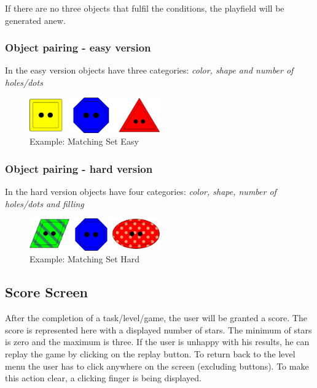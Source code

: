 If there are no three objects that fulfil the conditions, the playfield will be generated anew.

\subsubsection{Object pairing - easy version}\label{subsubsec:object-pairing---easy-version}
In the easy version objects have three categories: \textit{color, shape and number of holes/dots}

\begin{figure}[H]
    \centering
    \includegraphics[width=0.5\textwidth]{figures/matchingseteasy}
    \caption{Example: Matching Set Easy}
    \label{fig:matchingseteasy}
\end{figure}

\subsubsection{Object pairing - hard version}\label{subsubsec:object-pairing---hard-version}
In the hard version objects have four categories: \textit{color, shape, number of holes/dots and filling}

\begin{figure}[H]
    \centering
    \includegraphics[width=0.5\textwidth]{figures/matchingsethard}
    \caption{Example: Matching Set Hard}
    \label{fig:matchingsethard}
\end{figure}

\subsection{Score Screen}\label{subsec:score-screen}
After the completion of a task/level/game, the user will be granted a score.
The score is represented here with a displayed number of stars.
The minimum of stars is zero and the maximum is three.
If the user is unhappy with his results, he can replay the game by clicking on the replay button.
To return back to the level menu the user has to click anywhere on the screen (excluding buttons).
To make this action clear, a clicking finger is being displayed.

